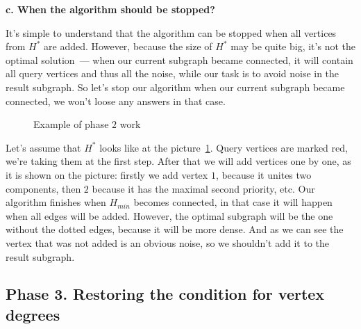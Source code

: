 \textbf{c. When the algorithm should be stopped?}

It's simple to understand that the algorithm can be stopped when all vertices from $H^*$ are added. However, because the size of $H^*$ may be quite big, it's not the optimal solution~--- when our current subgraph became connected, it will contain all query vertices and thus all the noise, while our task is to avoid noise in the result subgraph. So let's stop our algorithm when our current subgraph became connected, we won't loose any answers in that case.

\begin{figure}[!h]
\caption{Example of phase $2$ work}\label{phase2-example}
\centering
  \begin{center}
  \end{center}
\end{figure}

Let's assume that $H^*$ looks like at the picture~\ref{phase2-example}. Query vertices are marked red, we're taking them at the first step. After that we will add vertices one by one, as it is shown on the picture: firstly we add vertex $1$, because it unites two components, then $2$ because it has the maximal second priority, etc. Our algorithm finishes when $H_{min}$ becomes connected, in that case it will happen when all edges will be added. However, the optimal subgraph will be the one without the dotted edges, because it will be more dense. And as we can see the vertex that was not added is an obvious noise, so we shouldn't add it to the result subgraph.

\subsection{Phase 3. Restoring the condition for vertex degrees}

